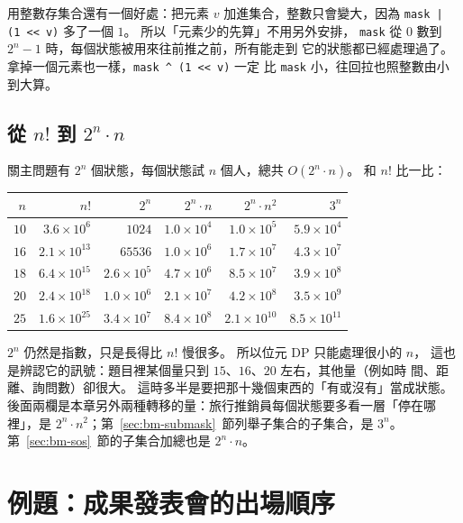 用整數存集合還有一個好處：把元素 $v$ 加進集合，整數只會變大，因為
\texttt{mask | (1 << v)} 多了一個 $1$。 所以「元素少的先算」不用另外安排，
\texttt{mask} 從 $0$ 數到 $2^n - 1$ 時，每個狀態被用來往前推之前，所有能走到
它的狀態都已經處理過了。 拿掉一個元素也一樣，\texttt{mask \^{} (1 << v)} 一定
比 \texttt{mask} 小，往回拉也照整數由小到大算。

\subsection{\texorpdfstring{從 $n!$ 到 $2^n \cdot n$}{從 n! 到 2ⁿ·n}}
\label{sec:bm-cost}

關主問題有 $2^n$ 個狀態，每個狀態試 $n$ 個人，總共 $O(2^n \cdot n)$。 和
$n!$ 比一比：

\begin{center}
\begin{tabular}{rrrrrr}
\toprule
$n$ & $n!$ & $2^n$ & $2^n \cdot n$ & $2^n \cdot n^2$ & $3^n$ \\
\midrule
$10$ & $3.6 \times 10^{6}$ & $1024$ & $1.0 \times 10^{4}$ & $1.0 \times 10^{5}$ & $5.9 \times 10^{4}$ \\
$16$ & $2.1 \times 10^{13}$ & $65536$ & $1.0 \times 10^{6}$ & $1.7 \times 10^{7}$ & $4.3 \times 10^{7}$ \\
$18$ & $6.4 \times 10^{15}$ & $2.6 \times 10^{5}$ & $4.7 \times 10^{6}$ & $8.5 \times 10^{7}$ & $3.9 \times 10^{8}$ \\
$20$ & $2.4 \times 10^{18}$ & $1.0 \times 10^{6}$ & $2.1 \times 10^{7}$ & $4.2 \times 10^{8}$ & $3.5 \times 10^{9}$ \\
$25$ & $1.6 \times 10^{25}$ & $3.4 \times 10^{7}$ & $8.4 \times 10^{8}$ & $2.1 \times 10^{10}$ & $8.5 \times 10^{11}$ \\
\bottomrule
\end{tabular}
\end{center}

$2^n$ 仍然是指數，只是長得比 $n!$ 慢很多。 所以位元 DP 只能處理很小的 $n$，
這也是辨認它的訊號：題目裡某個量只到 $15$、$16$、$20$ 左右，其他量（例如時
間、距離、詢問數）卻很大。 這時多半是要把那十幾個東西的「有或沒有」當成狀態。
後面兩欄是本章另外兩種轉移的量：旅行推銷員每個狀態要多看一層「停在哪裡」，是
$2^n \cdot n^2$；第~\ref{sec:bm-submask}~節列舉子集合的子集合，是 $3^n$。
第~\ref{sec:bm-sos}~節的子集合加總也是 $2^n \cdot n$。

\section{例題：成果發表會的出場順序}
\label{sec:ex-bm-show}

